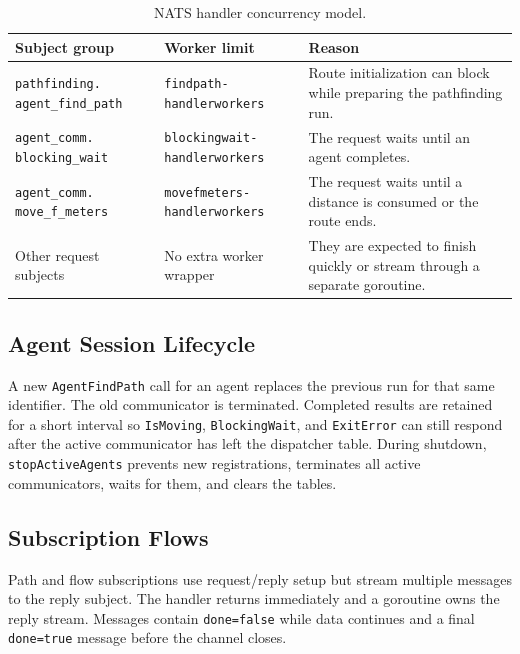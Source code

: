 \documentclass[12pt,a4paper]{report}
\begin{document}
\begin{table}[H]
\centering
\begin{tabular}{|p{}|p{}|p{}|}
\hline
\textbf{Subject group} & \textbf{Worker limit} & \textbf{Reason} \\
\hline
\texttt{pathfinding.} \newline \texttt{agent\_find\_path} &
\texttt{findpath-} \newline \texttt{handlerworkers} &
Route initialization can block while preparing the pathfinding run. \\
\hline
\texttt{agent\_comm.} \newline \texttt{blocking\_wait} &
\texttt{blockingwait-} \newline \texttt{handlerworkers} &
The request waits until an agent completes. \\
\hline
\texttt{agent\_comm.} \newline \texttt{move\_f\_meters} &
\texttt{movefmeters-} \newline \texttt{handlerworkers} &
The request waits until a distance is consumed or the route ends. \\
\hline
Other request subjects &
No extra worker wrapper &
They are expected to finish quickly or stream through a separate goroutine. \\
\hline
\end{tabular}
\caption{NATS handler concurrency model.}
\end{table}

\subsection{Agent Session Lifecycle}

A new \texttt{AgentFindPath} call for an agent replaces the previous run for
that same identifier. The old communicator is terminated. Completed results are
retained for a short interval so \texttt{IsMoving}, \texttt{BlockingWait}, and
\texttt{ExitError} can still respond after the active communicator has left the
dispatcher table. During shutdown, \texttt{stopActiveAgents} prevents new
registrations, terminates all active communicators, waits for them, and clears
the tables.

\subsection{Subscription Flows}

Path and flow subscriptions use request/reply setup but stream multiple messages
to the reply subject. The handler returns immediately and a goroutine owns the
reply stream. Messages contain \texttt{done=false} while data continues and a
final \texttt{done=true} message before the channel closes.
\end{document}
